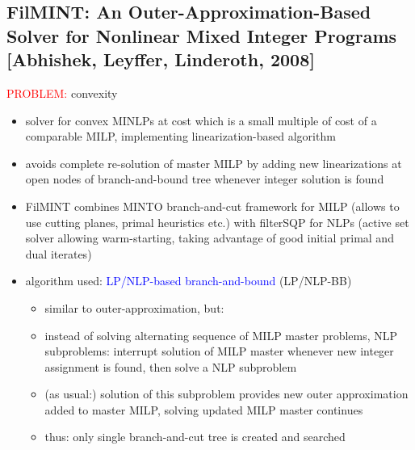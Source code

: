 \documentclass{article}
\begin{document}
\subsection{FilMINT: An Outer-Approximation-Based Solver for Nonlinear Mixed Integer Programs [Abhishek, Leyffer, Linderoth, 2008]}
\textcolor{red}{PROBLEM:} convexity
\begin{itemize}
\item solver for convex MINLPs at cost which is a small multiple of cost of a comparable MILP, implementing linearization-based algorithm
\item avoids complete re-solution of master MILP by adding new linearizations at open nodes of branch-and-bound tree whenever integer solution is found
\item FilMINT combines MINTO branch-and-cut framework for MILP (allows to use cutting planes, primal heuristics etc.)  with filterSQP for NLPs (active set solver allowing warm-starting, taking advantage of good initial primal and dual iterates)
\item algorithm used: \textcolor{blue}{LP/NLP-based branch-and-bound} (LP/NLP-BB) \cite{quesada1992lp}
\begin{itemize}
\item similar to outer-approximation, but:
\item instead of solving alternating sequence of MILP master problems, NLP subproblems: interrupt solution of MILP master whenever new integer assignment is found, then solve a NLP subproblem
\item (as usual:) solution of this subproblem provides new outer approximation added to master MILP, solving updated MILP master continues
\item thus: only single branch-and-cut tree is created and searched
\end{itemize}
\end{itemize}

\newpage
\end{document}
